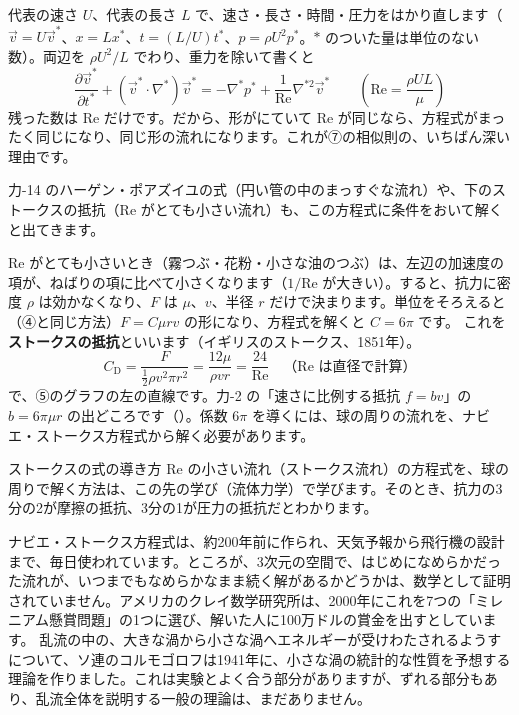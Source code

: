 代表の速さ $U$、代表の長さ $L$ で、速さ・長さ・時間・圧力をはかり直します（$\vec{v}=U\vec{v}^*$、$x=Lx^*$、$t=(L/U)t^*$、$p=\rho U^2p^*$。$*$ のついた量は単位のない数）。両辺を $\rho U^2/L$ でわり、重力を除いて書くと
\[\frac{\partial\vec{v}^*}{\partial t^*}+(\vec{v}^*\cdot\nabla^*)\vec{v}^*=-\nabla^*p^*+\frac{1}{\mathrm{Re}}\nabla^{*2}\vec{v}^*\qquad\left(\mathrm{Re}=\frac{\rho UL}{\mu}\right)\]
残った数は Re だけです。だから、形がにていて Re が同じなら、方程式がまったく同じになり、同じ形の流れになります。これが⑦の相似則の、いちばん深い理由です。

\begin{phflow}
\end{phflow}
力-14 のハーゲン・ポアズイユの式（円い管の中のまっすぐな流れ）や、下のストークスの抵抗（Re がとても小さい流れ）も、この方程式に条件をおいて解くと出てきます。

Re がとても小さいとき（霧つぶ・花粉・小さな油のつぶ）は、左辺の加速度の項が、ねばりの項に比べて小さくなります（$1/\mathrm{Re}$ が大きい）。すると、抗力に密度 $\rho$ は効かなくなり、$F$ は $\mu$、$v$、半径 $r$ だけで決まります。単位をそろえると（④と同じ方法）$F=C\mu rv$ の形になり、方程式を解くと $C=6\pi$ です。\label{ph:力-15:stokes}
\noindent これを\textbf{ストークスの抵抗}といいます（イギリスのストークス、1851年）。
\[ C_{\mathrm D}=\frac{F}{\frac{1}{2}\rho v^2\pi r^2}=\frac{12\mu}{\rho vr}=\frac{24}{\mathrm{Re}}\quad\text{（Re は直径で計算）} \]
で、⑤のグラフの左の直線です。力-2 の「速さに比例する抵抗 $f=bv$」の $b=6\pi\mu r$ の出どころです（\nobreak{}\nobreak）。係数 $6\pi$ を導くには、球の周りの流れを、ナビエ・ストークス方程式から解く必要があります。

\begin{phsaki}{ストークスの式の導き方}
Re の小さい流れ（ストークス流れ）の方程式を、球の周りで解く方法は、この先の学び（流体力学）で学びます。そのとき、抗力の3分の2が摩擦の抵抗、3分の1が圧力の抵抗だとわかります。
\end{phsaki}

\begin{phmada}
ナビエ・ストークス方程式は、約200年前に作られ、天気予報から飛行機の設計まで、毎日使われています。ところが、3次元の空間で、はじめになめらかだった流れが、いつまでもなめらかなまま続く解があるかどうかは、数学として証明されていません。アメリカのクレイ数学研究所は、2000年にこれを7つの「ミレニアム懸賞問題」の1つに選び、解いた人に100万ドルの賞金を出すとしています。
乱流の中の、大きな渦から小さな渦へエネルギーが受けわたされるようすについて、ソ連のコルモゴロフは1941年に、小さな渦の統計的な性質を予想する理論を作りました。これは実験とよく合う部分がありますが、ずれる部分もあり、乱流全体を説明する一般の理論は、まだありません。
\end{phmada}


